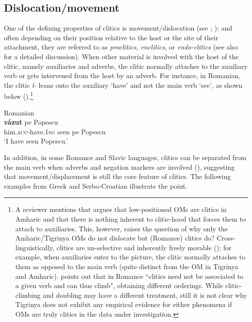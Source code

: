 \documentclass[output=paper]{langscibook}
\begin{document}
\subsection{Dislocation/movement}\label{sec:Gebregziabher:dislocate}
One of the defining properties of clitics is movement/dislocation (see \citealt{sport96}; \citealt{polettoandpollock2004}); and often depending on their position relative to the host or the site of their attachment, they are referred to as \emph{proclitics, enclitics}, or \emph{endo-clitics} (see also \citealt{spencerandluis} for a detailed discussion). 
When other material is involved with the host of the clitic, namely auxiliaries and adverbs, the clitic normally attaches to the auxiliary verb or gets intervened from the host by an adverb. For instance, in Romanian, the clitic \emph{l-} leans onto the auxiliary `have' and not the main verb `see', as shown below (\citealt{ana05}).\footnote{A reviewer mentions that \citet{kramer14} argues that low-positioned OMs are clitics in Amharic and that there is nothing inherent to clitic-hood that forces them to attach to auxiliaries. This, however, raises the question of why only the Amharic/Tigrinya OMs do not dislocate but (Romance) clitics do? Cross-linguistically, clitics are un-selective and inherently freely movable (\citealt{spencerandluis}); for example, when auxiliaries enter to the picture, the clitic normally attaches to them as opposed to the main verb (quite distinct from the OM in Tigrinya and Amharic). \citet[108]{uri95} points out that in Romance ``clitics need not be associated to a given verb and can thus climb", obtaining different orderings. While clitic- climbing and doubling may have a different treatment, still it is not clear why Tigrinya does not exhibit any empirical evidence for either phenomena if OMs are truly clitics in the data under investigation.}

\ea\label{ex:Gebregziabher:balkanhave} Romanian \citep[532]{ana05}\\
 {\textbf{v\'azut}} pe Popescu \\
him.{\scshape acc}-have.{\scshape 1sg} seen pe Popescu\\
\glt `I have seen Popescu.' 
\z

\noindent In addition, in some Romance and Slavic languages, clitics can be separated from the main verb when adverbs and negation markers are involved (\citealt{giustiandstavrou08}), suggesting that movement/displacement is still the core feature of clitics. The following examples from Greek and Serbo-Croatian illustrate the point.
\end{document}
